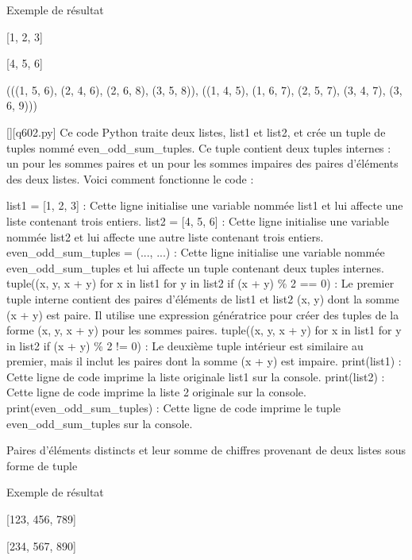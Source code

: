 Exemple de résultat

[1, 2, 3]

[4, 5, 6]

(((1, 5, 6), (2, 4, 6), (2, 6, 8), (3, 5, 8)), ((1, 4, 5), (1, 6, 7), (2, 5, 7), (3, 4, 7), (3, 6, 9)))
        \par
        \begin{solution}
            \renewcommand{\nomfichier}{q602.py}
            \pythonfile{\chemincode \nomfichier}[][\nomfichier]
            Ce code Python traite deux listes, list1 et list2, et crée un tuple de tuples nommé even\_odd\_sum\_tuples. Ce tuple contient deux tuples internes : un pour les sommes paires et un pour les sommes impaires des paires d'éléments des deux listes. Voici comment fonctionne le code :

    list1 = [1, 2, 3] : Cette ligne initialise une variable nommée list1 et lui affecte une liste contenant trois entiers.
    list2 = [4, 5, 6] : Cette ligne initialise une variable nommée list2 et lui affecte une autre liste contenant trois entiers.
    even\_odd\_sum\_tuples = (..., ...) : Cette ligne initialise une variable nommée even\_odd\_sum\_tuples et lui affecte un tuple contenant deux tuples internes.
        tuple((x, y, x + y) for x in list1 for y in list2 if (x + y) \% 2 == 0) : Le premier tuple interne contient des paires d'éléments de list1 et list2 (x, y) dont la somme (x + y) est paire. Il utilise une expression génératrice pour créer des tuples de la forme (x, y, x + y) pour les sommes paires.
        tuple((x, y, x + y) for x in list1 for y in list2 if (x + y) \% 2 != 0) : Le deuxième tuple intérieur est similaire au premier, mais il inclut les paires dont la somme (x + y) est impaire.
    print(list1) : Cette ligne de code imprime la liste originale list1 sur la console.
    print(list2) : Cette ligne de code imprime la liste 2 originale sur la console.
    print(even\_odd\_sum\_tuples) : Cette ligne de code imprime le tuple even\_odd\_sum\_tuples sur la console.
        \end{solution}
        

        \question
        Paires d'éléments distincts et leur somme de chiffres provenant de deux listes sous forme de tuple

Exemple de résultat

[123, 456, 789]

[234, 567, 890]


